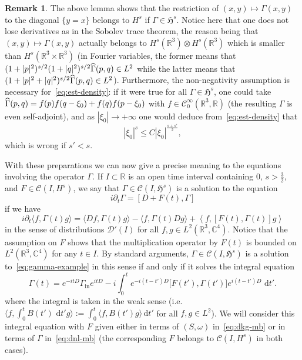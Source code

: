 \documentclass[10pt]{amsart}
\theoremstyle{definition}\newtheorem{defi}[theo]{Definition}\newtheorem{rema}[theo]{Remark}\newtheorem{exam}[theo]{Example}\newtheorem{exem}[theo]{Example}\newtheorem{nota}[theo]{Notation}
\newcommand{\rmin}{\mathrm{in}}
\newcommand{\cD}{\mathcal{D}}
\newcommand{\cC}{\mathcal{C}}
\newcommand\R{\mathbb{R}}
\newcommand\C{\mathbb{C}}
\renewcommand\hat{\widehat}
\newcommand{\gH}{\mathfrak{H}}
\newcommand\ii{{\ensuremath {\infty}}}
\renewcommand\d[1]{{\ensuremath{\,\text{d}#1}}}
\let\oldhat\hat
\renewcommand*{\hat}[1]{\mathchoice{\widehat{#1}}{\widehat{#1}}{\oldhat{#1}}{\oldhat{#1}}}
\begin{document}
\begin{rema}
The above lemma shows that the restriction of $(x,y)\mapsto\Gamma(x,y)$ to the diagonal $\{y=x\}$ belongs to $H^s$ if $\Gamma\in\gH^s$. Notice here that one does not lose derivatives as in the Sobolev trace theorem, the reason being that $(x,y)\mapsto \Gamma(x,y)$ actually belongs to $H^s(\R^3)\otimes H^s(\R^3)$ which is smaller than $H^s(\R^3\times\R^3)$ (in Fourier variables, the former means that $(1+|p|^2)^{s/2}(1+|q|^2)^{s/2}\hat{\Gamma}(p,q)\in L^2$ while the latter means that $(1+|p|^2+|q|^2)^{s/2}\hat{\Gamma}(p,q)\in L^2$). Furthermore, the non-negativity assumption is necessary for~\eqref{eq:est-density}: if it were true for all $\Gamma\in\gH^s$, one could take $\hat{\Gamma}(p,q)=f(p)f(q-\xi_0)+f(q)f(p-\xi_0)$ with $f\in \cC^\ii_0(\R^3,\R)$ (the resulting $\Gamma$ is even self-adjoint), and as $|\xi_0|\to+\ii$ one would deduce from~\eqref{eq:est-density} that
\[
|\xi_0|^{s}\leq C|\xi_0|^{\frac{s+s'}{2}},
\]
which is wrong if $s'<s$.
\end{rema}

With these preparations we can now give a precise meaning to the equations involving the operator $\Gamma$. If $I\subset\R$ is an open time interval containing $0$, $s>\tfrac32$, and $F\in \cC(I,H^s)$, we say that $\Gamma\in \cC(I,\gH^s)$ is a solution to the equation
\begin{equation}\label{eq:gamma-example}
i\partial_t\Gamma=[D+F(t),\Gamma]
\end{equation}
if we have
\[
i\partial_t \langle f,\Gamma(t) g\rangle = \langle Df,\Gamma(t) g\rangle - \langle f,\Gamma(t) Dg\rangle + \left\langle f,[F(t),\Gamma(t)]g\right\rangle
\]
in the sense of distributions $\cD'(I)$ for all $f,g\in L^2(\R^3,\C^4)$. Notice that the assumption on $F$ shows that the multiplication operator by $F(t)$ is bounded on $L^2(\R^3,\C^4)$ for any $t\in I$. By standard arguments, $\Gamma\in \cC(I,\gH^s)$ is a solution to~\eqref{eq:gamma-example} in this sense if and only if it solves the integral equation
\begin{equation}
\Gamma(t)= e^{-itD} \Gamma_{\rmin} e^{itD} - i\int_0^te^{-i(t-t')D}\big[F(t'),\Gamma(t')\big]e^{i(t-t')D}\,\d t'.
\end{equation}
where the integral is taken in the weak sense (i.e. $\langle f,\int_0^t B(t')\,\d t' g\rangle := \int_0^t \langle f,B(t') g\rangle \d t'$ for all $f,g\in L^2$). We will consider this integral equation with $F$ given either in terms of $(S,\omega)$ in~\eqref{eq:dkg-mb} or in terms of $\Gamma$ in~\eqref{eq:dnl-mb} (the corresponding $F$ belongs to $\cC(I,H^s)$ in both cases).
\end{document}
